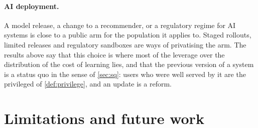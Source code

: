 \documentclass[11pt,a4paper]{article}
\theoremstyle{plain}
\theoremstyle{definition}
\theoremstyle{remark}
\begin{document}
\paragraph{AI deployment.} A model release, a change to a recommender, or a regulatory regime for AI systems is close to a public arm for the population it applies to. Staged rollouts, limited releases and regulatory sandboxes are ways of privatising the arm. The results above say that this choice is where most of the leverage over the distribution of the cost of learning lies, and that the previous version of a system is a status quo in the sense of \cref{sec:sq}: users who were well served by it are the privileged of \cref{def:privilege}, and an update is a reform.

\section{Limitations and future work}\label{sec:limits}
\end{document}
